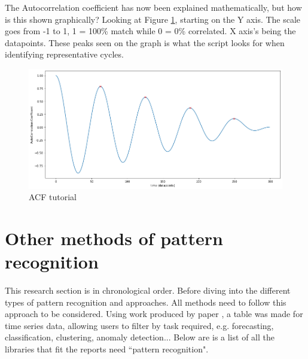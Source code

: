 The Autocorrelation coefficient has now been explained mathematically, but how is this shown graphically? 
Looking at Figure \ref{ACF coefficient}, starting on the Y axis. The scale goes from -1 to 1, 1 = 100\% match while 0 = 0\% correlated. X axis's being the datapoints. These peaks seen on the graph is what the script looks for when identifying representative cycles. 
\begin{figure}[h]
\centering
\includegraphics[scale=0.45]{images/ACF u DIAGRAM.png}
\caption{ACF tutorial}
\label{ACF coefficient}
\end{figure}

\section{Other methods of pattern recognition}
This research section is in chronological order. Before diving into the different types of pattern recognition and approaches. All methods need to follow this approach to be considered. Using work produced by paper \cite{DBLP:journals/corr/abs-2104-07406}, a table was made for time series data, allowing users to filter by task required, e.g. forecasting,	classification,	clustering,	anomaly detection... Below are is a list of all the libraries that fit the reports need ``pattern recognition".



